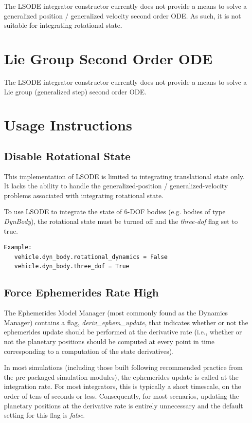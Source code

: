 The LSODE integrator constructor currently does not provide a means
to solve a generalized position / generalized velocity second order ODE.
As such, it is not suitable for integrating rotational state.

\section{Lie Group Second Order ODE}

The LSODE integrator constructor currently does not provide a means
to solve a Lie group (generalized step) second order ODE.

\section{Usage Instructions}

\subsection{Disable Rotational State}

This implementation of LSODE is limited to integrating translational state
only.  It lacks the ability to handle the generalized-position /
generalized-velocity problems associated with integrating rotational state.

To use LSODE to integrate the state of 6-DOF bodies (e.g. bodies of type
\textit{DynBody}), the rotational state must be turned off and the
\textit{three-dof} flag set to true.

\begin{verbatim}
Example:
   vehicle.dyn_body.rotational_dynamics = False
   vehicle.dyn_body.three_dof = True
\end{verbatim}

\subsection{Force Ephemerides Rate High}

The Ephemerides Model Manager (most commonly found as the Dynamics Manager)
contains a flag, \textit{deriv\_ephem\_update}, that indicates whether or not
the
ephemerides update should be performed at the derivative rate (i.e.,
whether or not the planetary positions should be computed at every point in
time corresponding to a computation of the state derivatives).

In most
simulations (including those built following recommended practice from the
pre-packaged
simulation-modules), the ephemerides update is called at the integration
rate.  For most integrators, this is typically a short timescale, on the order
of tens of seconds or less. Consequently, for most scenarios, updating the
planetary positions at the derivative rate is entirely unnecessary and the
default
setting for this flag is \textit{false}.


